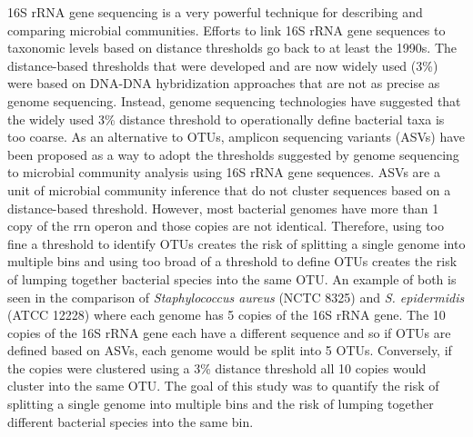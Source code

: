 \documentclass[
]{article}
\begin{document}
16S rRNA gene sequencing is a very powerful technique for describing and
comparing microbial communities. Efforts to link 16S rRNA gene sequences
to taxonomic levels based on distance thresholds go back to at least the
1990s. The distance-based thresholds that were developed and are now
widely used (3\%) were based on DNA-DNA hybridization approaches that
are not as precise as genome sequencing. Instead, genome sequencing
technologies have suggested that the widely used 3\% distance threshold
to operationally define bacterial taxa is too coarse. As an alternative
to OTUs, amplicon sequencing variants (ASVs) have been proposed as a way
to adopt the thresholds suggested by genome sequencing to microbial
community analysis using 16S rRNA gene sequences. ASVs are a unit of
microbial community inference that do not cluster sequences based on a
distance-based threshold. However, most bacterial genomes have more than
1 copy of the rrn operon and those copies are not identical. Therefore,
using too fine a threshold to identify OTUs creates the risk of
splitting a single genome into multiple bins and using too broad of a
threshold to define OTUs creates the risk of lumping together bacterial
species into the same OTU. An example of both is seen in the comparison
of \emph{Staphylococcus aureus} (NCTC 8325) and \emph{S. epidermidis}
(ATCC 12228) where each genome has 5 copies of the 16S rRNA gene. The 10
copies of the 16S rRNA gene each have a different sequence and so if
OTUs are defined based on ASVs, each genome would be split into 5 OTUs.
Conversely, if the copies were clustered using a 3\% distance threshold
all 10 copies would cluster into the same OTU. The goal of this study
was to quantify the risk of splitting a single genome into multiple bins
and the risk of lumping together different bacterial species into the
same bin.
\end{document}
